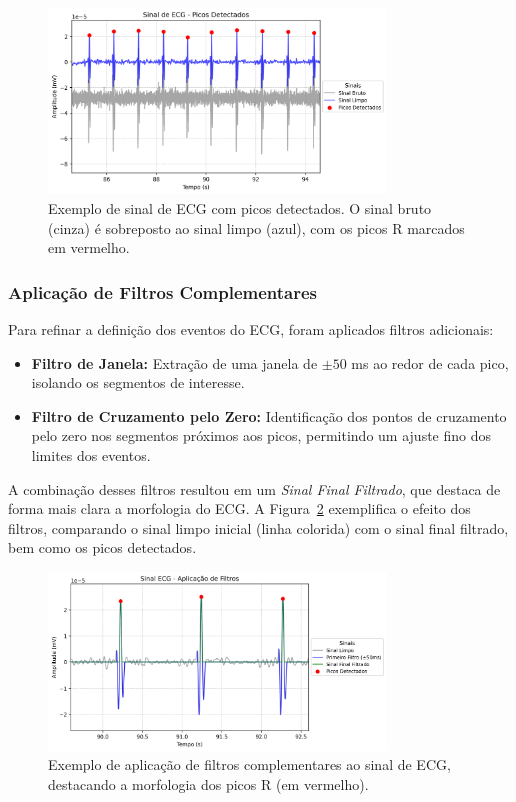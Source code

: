 \begin{figure}[htb]
    \centering
    \includegraphics[width=0.8\textwidth]{figs/2_preprocessamento_ecg/1_Sinal_de_ECG_-_Picos_Detectados_zoom.png}
    \caption{Exemplo de sinal de ECG com picos detectados. O sinal bruto (cinza) é sobreposto ao sinal limpo (azul), com os picos R marcados em vermelho.}
    \label{fig:ecg_picos_detectados}
\end{figure}

\subsubsection{Aplicação de Filtros Complementares}
Para refinar a definição dos eventos do ECG, foram aplicados filtros adicionais:
\begin{itemize}
    \item \textbf{Filtro de Janela:} Extração de uma janela de \(\pm50\) ms ao redor de cada pico, isolando os segmentos de interesse.
    \item \textbf{Filtro de Cruzamento pelo Zero:} Identificação dos pontos de cruzamento pelo zero nos segmentos próximos aos picos, permitindo um ajuste fino dos limites dos eventos.
\end{itemize}
A combinação desses filtros resultou em um \emph{Sinal Final Filtrado}, que destaca de forma mais clara a morfologia do ECG. A Figura~\ref{fig:ecg_filtros_aplicados} exemplifica o efeito dos filtros, comparando o sinal limpo inicial (linha colorida) com o sinal final filtrado, bem como os picos detectados.

\begin{figure}[htb]
    \centering
    \includegraphics[width=0.8\textwidth]{figs/2_preprocessamento_ecg/2_Sinal_ECG_-_Aplicação_de_Filtros_zoom.png}
    \caption{Exemplo de aplicação de filtros complementares ao sinal de ECG, destacando a morfologia dos picos R (em vermelho).}
    \label{fig:ecg_filtros_aplicados}
\end{figure}
